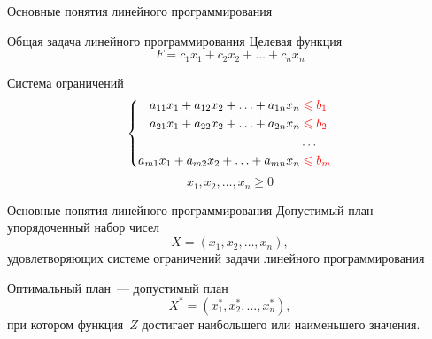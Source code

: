 \documentclass[unicode,11pt,notheorems]{beamer}
\begin{document}
	\begin{frame}[t]{}{}
		\vspace{2cm}
		{\LARGE Основные понятия линейного программирования\par}
		\vspace{\fill}
		
	\end{frame}   
	\begin{frame}{Общая задача линейного программирования}{}
		\alert{Целевая функция}
		$$
		F=c_1x_1+c_2x_2+\ldots+c_n x_n
		$$
		
		\alert{Система ограничений}
		$$
		\left\lbrace
		\begin{aligned}
		a_{11} x_1 + a_{12} x_2 + \ldots + a_{1n} x_n & \color{red} \leqslant b_1\\
		a_{21} x_1 + a_{22} x_2 + \ldots + a_{2n} x_n &\color{red} \leqslant b_2\\
		&\ldots\\
		a_{m1} x_1 + a_{m2} x_2 + \ldots + a_{mn} x_n &\color{red} \leqslant b_m
		\end{aligned}
		\right.
		$$
		$$x_1, x_2, \ldots, x_n \geqslant 0$$
		
	\end{frame}   
	
	
	
	
	\begin{frame}{Основные понятия линейного программирования}{}
		\alert{Допустимый план}~--- упорядоченный набор чисел
		$$
		X=(x_1,x_2,\ldots,x_n),
		$$    
		удовлетворяющих системе ограничений задачи линейного программирования
		
		\vspace{4em}
		
		\alert{Оптимальный план}~--- допустимый	план
		$$
		X^*=(x_1^*,x_2^*,\ldots,x_n^*),
		$$    
		при котором функция~$Z$ достигает наибольшего или наименьшего значения.
		
	\end{frame} 
	
	
	
\end{document}
